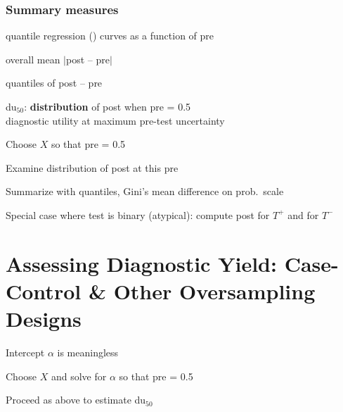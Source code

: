 \subsubsection{Summary measures}
 \bi
 \item quantile regression {\smaller[2](\cite{koe78reg})} curves as a function of pre
 \item overall mean $|$post -- pre$|$
 \item quantiles of post -- pre
 \item du$_{50}$: \textbf{distribution} of post when pre = 0.5 \\
 diagnostic utility at maximum pre-test uncertainty 
  \bi
  \item Choose $X$ so that pre = 0.5
  \item Examine distribution of post at this pre
  \item Summarize with quantiles, Gini's mean difference on prob.\
 scale
  \item Special case where test is binary (atypical): compute post for
 $T^{+}$ and for $T^{-}$
  \ei
\ei

\section{Assessing Diagnostic Yield: Case-Control \& Other Oversampling Designs}
\bi
\item Intercept $\alpha$ is meaningless
\item Choose $X$ and solve for $\alpha$ so that pre = 0.5
\item Proceed as above to estimate du$_{50}$
\ei

